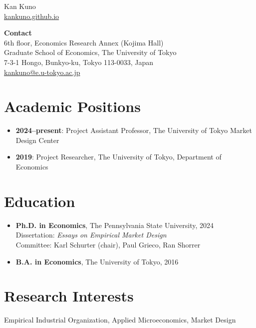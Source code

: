 \documentclass[11pt]{article}
\begin{document}
\begin{center}
{\LARGE Kan Kuno}\\
\href{https://kankuno.github.io}{kankuno.github.io}
\end{center}

\vspace{4pt}

\textbf{Contact}\\
6th floor, Economics Research Annex (Kojima Hall)\\
Graduate School of Economics, The University of Tokyo\\
7-3-1 Hongo, Bunkyo-ku, Tokyo 113-0033, Japan\\
\href{mailto:kankuno@e.u-tokyo.ac.jp}{kankuno@e.u-tokyo.ac.jp}

\section*{Academic Positions}
\begin{itemize}
\item \textbf{2024--present}: Project Assistant Professor, The University of Tokyo Market Design Center
\item \textbf{2019}: Project Researcher, The University of Tokyo, Department of Economics
\end{itemize}

\section*{Education}
\begin{itemize}
\item \textbf{Ph.D. in Economics}, The Pennsylvania State University, 2024\\
Dissertation: \textit{Essays on Empirical Market Design}\\
Committee: Karl Schurter (chair), Paul Grieco, Ran Shorrer
\item \textbf{B.A. in Economics}, The University of Tokyo, 2016
\end{itemize}

\section*{Research Interests}
Empirical Industrial Organization, Applied Microeconomics, Market Design
\end{document}
